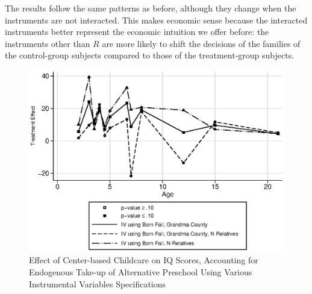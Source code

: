 \noindent The results follow the same patterns as before, although they change when the instruments are not interacted. This makes economic sense because the interacted instruments better represent the economic intuition we offer before: the instruments other than $R$ are more likely to shift the decisions of the families of the control-group subjects compared to those of the treatment-group subjects.

\begin{figure}[H]
		\caption{Effect of Center-based Childcare on IQ Scores, Accounting for Endogenous Take-up of Alternative Preschool Using Various Instrumental Variables Specifications} \label{fig:nointer_Q_iv}
		\includegraphics[width=.8\columnwidth]{output/appendixplots/nointer_Q_iv_te.eps}
\end{figure}

